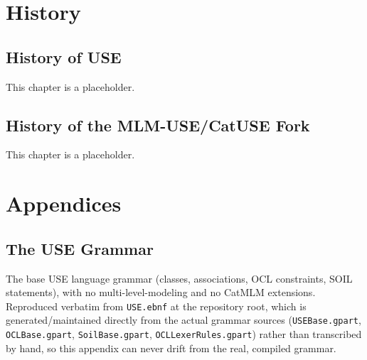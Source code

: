 \documentclass[11pt,twoside,a4paper]{book}
\begin{document}
\part{History}
\label{sec:orgc5ae712}
\chapter{History of USE}
\label{sec:orgc92fa29}
This chapter is a placeholder.
\chapter{History of the MLM-USE/CatUSE Fork}
\label{sec:orga2d4c2e}
This chapter is a placeholder.

\appendix

\part{Appendices}
\label{sec:org4e718de}
\chapter{The USE Grammar}
\label{sec:orgd28d585}
The base USE language grammar (classes, associations, OCL constraints,
SOIL statements), with no multi-level-modeling and no CatMLM extensions.
Reproduced verbatim from \texttt{USE.ebnf} at the repository root, which is
generated/maintained directly from the actual grammar sources
(\texttt{USEBase.gpart}, \texttt{OCLBase.gpart}, \texttt{SoilBase.gpart},
\texttt{OCLLexerRules.gpart}) rather than transcribed by hand, so this appendix
can never drift from the real, compiled grammar.
\end{document}
